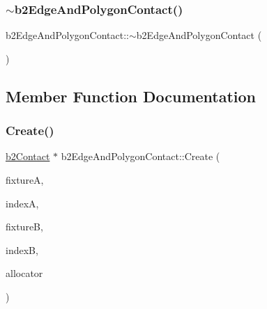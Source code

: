 \mbox{\label{classb2_edge_and_polygon_contact_a7e9060b470a46edaeb0d7f87a09e658a}} 
\subsubsection{\texorpdfstring{$\sim$b2EdgeAndPolygonContact()}{~b2EdgeAndPolygonContact()}}
{\footnotesize\ttfamily b2\+Edge\+And\+Polygon\+Contact\+::$\sim$b2\+Edge\+And\+Polygon\+Contact (\begin{DoxyParamCaption}{ }\end{DoxyParamCaption})\hspace{0.3cm}{\ttfamily [inline]}}



\subsection{Member Function Documentation}
\mbox{\label{classb2_edge_and_polygon_contact_a3a0bcb2327e02bfc2079a734d8e9c8f7}} 
\subsubsection{\texorpdfstring{Create()}{Create()}}
{\footnotesize\ttfamily \mbox{\hyperlink{classb2_contact}{b2\+Contact}} $\ast$ b2\+Edge\+And\+Polygon\+Contact\+::\+Create (\begin{DoxyParamCaption}\item[{\mbox{\hyperlink{classb2_fixture}{b2\+Fixture}} $\ast$}]{fixtureA,  }\item[{\mbox{\hyperlink{b2_settings_8h_a43d43196463bde49cb067f5c20ab8481}{int32}}}]{indexA,  }\item[{\mbox{\hyperlink{classb2_fixture}{b2\+Fixture}} $\ast$}]{fixtureB,  }\item[{\mbox{\hyperlink{b2_settings_8h_a43d43196463bde49cb067f5c20ab8481}{int32}}}]{indexB,  }\item[{\mbox{\hyperlink{classb2_block_allocator}{b2\+Block\+Allocator}} $\ast$}]{allocator }\end{DoxyParamCaption})\hspace{0.3cm}{\ttfamily [static]}}

